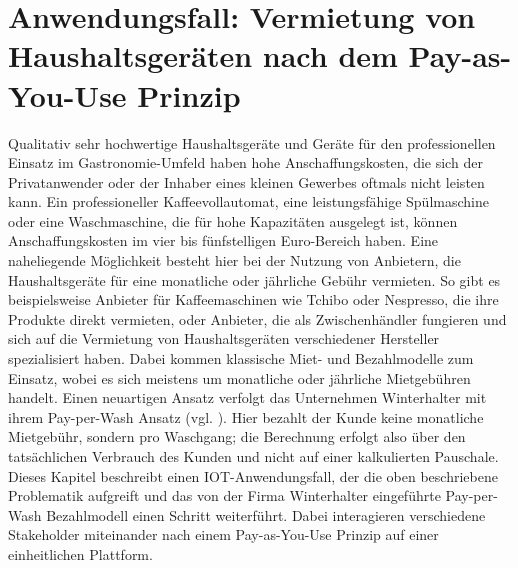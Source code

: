 \chapter{Anwendungsfall: Vermietung von Haushaltsgeräten nach dem Pay-as-You-Use Prinzip}
\label{ch:iot_usecase}
Qualitativ sehr hochwertige Haushaltsgeräte und Geräte für den professionellen Einsatz im Gastronomie-Umfeld haben hohe Anschaffungskosten, die sich der Privatanwender oder der Inhaber eines kleinen Gewerbes oftmals nicht leisten kann. Ein professioneller Kaffeevollautomat, eine leistungsfähige Spülmaschine oder eine Waschmaschine, die für hohe Kapazitäten ausgelegt ist, können Anschaffungskosten im vier bis fünfstelligen Euro-Bereich haben. Eine naheliegende Möglichkeit besteht hier bei der Nutzung von Anbietern, die Haushaltsgeräte für eine monatliche oder jährliche Gebühr vermieten. So gibt es beispielsweise Anbieter für Kaffeemaschinen wie Tchibo oder Nespresso, die ihre Produkte direkt vermieten, oder Anbieter, die als Zwischenhändler fungieren und sich auf die Vermietung von Haushaltsgeräten verschiedener Hersteller spezialisiert haben. Dabei kommen klassische Miet- und Bezahlmodelle zum Einsatz, wobei es sich meistens um monatliche oder jährliche Mietgebühren handelt. Einen neuartigen Ansatz verfolgt das Unternehmen Winterhalter mit ihrem Pay-per-Wash Ansatz (vgl. \cite{PayPerWash2020}). Hier bezahlt der Kunde keine monatliche Mietgebühr, sondern pro Waschgang; die Berechnung erfolgt also über den tatsächlichen Verbrauch des Kunden und nicht auf einer kalkulierten Pauschale.\\
Dieses Kapitel beschreibt einen IOT-Anwendungsfall, der die oben beschriebene Problematik aufgreift und das von der Firma Winterhalter eingeführte Pay-per-Wash Bezahlmodell einen Schritt weiterführt. Dabei interagieren verschiedene Stakeholder miteinander nach einem Pay-as-You-Use Prinzip auf einer einheitlichen Plattform.

%
%
